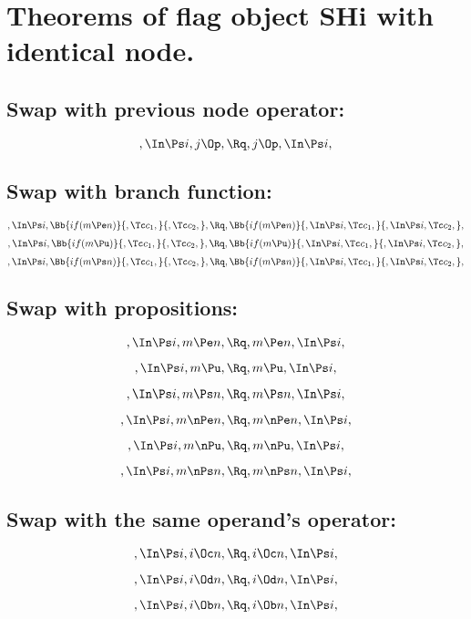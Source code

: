 \bigskip
\bigskip
\bigskip
\bigskip
\section{Theorems of flag object SHi with identical node.}
\subsection{Swap with previous node operator:}
\[,\In \Ps i, j \Op, \Rq ,j \Op, \In \Ps i,\]

\bigskip
\bigskip
\subsection{Swap with branch function:}
\[,\In \Ps i, \Bb{if(m \Pe n)}{,\Tc c_1,}{,\Tc c_2,}, \Rq , \Bb{if(m \Pe n)}{,\In \Ps i, \Tc c_1,}{,\In \Ps i, \Tc c_2,},\]
\bigskip
\bigskip
\[,\In \Ps i, \Bb{if(m \Pu)}{,\Tc c_1,}{,\Tc c_2,}, \Rq , \Bb{if(m \Pu)}{,\In \Ps i, \Tc c_1,}{,\In \Ps i, \Tc c_2,},\]
\bigskip
\bigskip
\[,\In \Ps i, \Bb{if(m \Ps n)}{,\Tc c_1,}{,\Tc c_2,}, \Rq , \Bb{if(m \Ps n)}{,\In \Ps i, \Tc c_1,}{,\In \Ps i, \Tc c_2,},\]


\bigskip
\bigskip
\subsection{Swap with propositions:}
\[,\In \Ps i, m \Pe n, \Rq , m \Pe n, \In \Ps i,\]

\[,\In \Ps i, m \Pu, \Rq , m \Pu, \In \Ps i,\]

\[,\In \Ps i, m \Ps n, \Rq , m \Ps n, \In \Ps i,\]

\[,\In \Ps i, m \nPe n, \Rq , m \nPe n, \In \Ps i,\]

\[,\In \Ps i, m \nPu, \Rq , m \nPu, \In \Ps i,\]

\[,\In \Ps i, m \nPs n, \Rq , m \nPs n, \In \Ps i,\]



\bigskip
\bigskip
\subsection{Swap with the same operand's operator:}
\[,\In \Ps i, i \Oc n, \Rq , i \Oc n, \In \Ps i,\]

\[,\In \Ps i, i \Od n, \Rq , i \Od n, \In \Ps i,\]

\[,\In \Ps i, i \Ob n, \Rq , i \Ob n, \In \Ps i,\]


\bigskip
\bigskip
